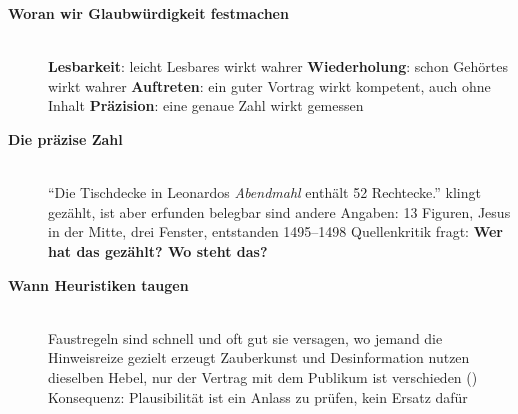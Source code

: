 \begin{description}
\item[{\rot\bf Woran wir Glaubwürdigkeit festmachen}]~\\[-\lblskip]
\bi
  \ite \textbf{Lesbarkeit}: leicht Lesbares wirkt wahrer
    \parencite{reber1999fluency}
  \ite \textbf{Wiederholung}: schon Gehörtes wirkt wahrer
    \parencite{hasher1977frequency}
  \ite \textbf{Auftreten}: ein guter Vortrag wirkt kompetent, auch ohne
    Inhalt \parencite{naftulin1973drfox}
  \ite \textbf{Präzision}: eine genaue Zahl wirkt gemessen
\ei
\os{\newpage}

\item[{\rot\bf Die präzise Zahl}]~\\[-\lblskip]
\bi
  \ite \enquote{Die Tischdecke in Leonardos \emph{Abendmahl} enthält 52
    Rechtecke.}
  \ite klingt gezählt, ist aber erfunden
  \ite belegbar sind andere Angaben: 13 Figuren, Jesus in der Mitte,
    drei Fenster, entstanden 1495--1498
  \ite Quellenkritik fragt: \textbf{Wer hat das gezählt? Wo steht das?}
\ei
{}
\os{\newpage}

\item[{\rot\bf Wann Heuristiken taugen}]~\\[-\lblskip]
\bi
  \ite Faustregeln sind schnell und oft gut \parencite{gigerenzertodd1999}
  \ite sie versagen, wo jemand die Hinweisreize gezielt erzeugt
  \ite Zauberkunst und Desinformation nutzen dieselben Hebel, nur der
    Vertrag mit dem Publikum ist verschieden ()
  \ite Konsequenz: Plausibilität ist ein Anlass zu prüfen, kein Ersatz
    dafür
\ei
\os{\newpage}
\end{description}

